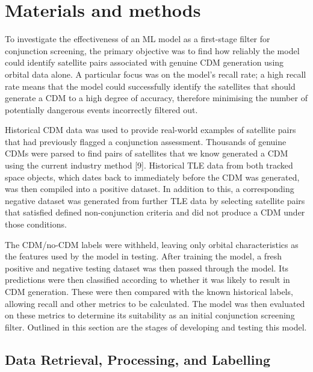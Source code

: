 \documentclass[letterpaper,11pt,leqno]{article}
\begin{document}
\section{Materials and methods}\label{s:methods}

To investigate the effectiveness of an ML model as a first-stage filter for conjunction screening, the primary objective was to find how reliably the model could identify satellite pairs associated with genuine CDM generation using orbital data alone. A particular focus was on the model’s recall rate; a high recall rate means that the model could successfully identify the satellites that should generate a CDM to a high degree of accuracy, therefore minimising the number of potentially dangerous events incorrectly filtered out. 

Historical CDM data was used to provide real-world examples of satellite pairs that had previously flagged a conjunction assessment. Thousands of genuine CDMs were parsed to find pairs of satellites that we know generated a CDM using the current industry method [9]. Historical TLE data from both tracked space objects, which dates back to immediately before the CDM was generated, was then compiled into a positive dataset. In addition to this, a corresponding negative dataset was generated from further TLE data by selecting satellite pairs that satisfied defined non-conjunction criteria and did not produce a CDM under those conditions.

The CDM/no-CDM labels were withheld, leaving only orbital characteristics as the features used by the model in testing. After training the model, a fresh positive and negative testing dataset was then passed through the model. Its predictions were then classified according to whether it was likely to result in CDM generation. These were then compared with the known historical labels, allowing recall and other metrics to be calculated. The model was then evaluated on these metrics to determine its suitability as an initial conjunction screening filter. Outlined in this section are the stages of developing and testing this model.

\subsection{Data Retrieval, Processing, and Labelling}
\end{document}
